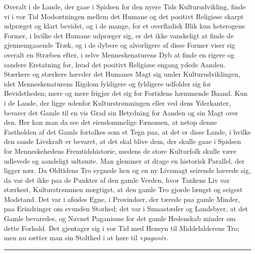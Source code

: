 \documentclass[12pt,a4paper,openany]{book}
\newcommand{\opage}[1]{\marginnote{\footnotesize\textit{[#1]}}}
\begin{document}
Overalt i de Lande, der gaae i Spidsen for den nyere Tids
Kulturudvikling, finde vi i vor Tid Modsætningen mellem
det Humane og det positivt Religiøse skarpt udpræget og
klart bevidst, og i de mange, for et overfladisk Blik kun
heterogene Former, i hvilke det Humane udpræger sig, er
det ikke vanskeligt at finde de gjennemgaaende Træk, og i de
dybere og alvorligere af disse Former viser sig overalt en
Stræben efter, i selve Menneskenaturens Dyb at finde en
rigere og sandere Erstatning for, hvad det positivt Religiøse
engang ydede Aanden. Stærkere og stærkere hævder det
Humanes Magt sig under Kulturudviklingen, idet Menneskenaturens
Rigdom fyldigere og fyldigere udfolder sig for
Bevidstheden; mere og mere frigjør det sig for Fortidens
hæmmende Baand. Kun i de Lande, der ligge udenfor
Kulturstrømningen eller ved dens Yderkanter, bevarer det
Gamle til en vis Grad sin Betydning for Aanden og sin
Magt over den. Her kan man da see det eiendommelige
Fænomen, at netop denne Fastholden af det Gamle fortolkes
som et Tegn paa, at det er disse Lande, i hvilke den
sande Livskraft er bevaret, at det skal blive dem, der skulle
gaae i Spidsen for Menneskehedens Fremtidshistorie, medens
de store Kulturfolk skulle være udlevede og aandeligt udtømte.
\opage{294}Man glemmer at drage en historisk Parallel, der ligger nær.
Da Oldtidens Tro sygnede hen og en ny Livsmagt seirende
hævede sig, da var det ikke paa de Punkter af den gamle
Verden, hvor Tankens Liv var stærkest, Kulturstrømmen
mægtigst, at den gamle Tro gjorde længst og seigest Modstand.
Det var i afsides Egne, i Provindser, der tærede
paa gamle Minder, paa Erindringer om svunden Storhed;
det var i Smaastæder og Landsbyer, at det Gamle bevaredes,
og Navnet Paganisme for det gamle Hedenskab
minder om dette Forhold. Det gjentager sig i vor Tid
med Hensyn til Middelalderens Tro; men nu sætter man
sin Stolthed i at høre til »\textit{pagani}«.

\begin{center}\rule{1.8cm}{0.4pt}\end{center}
\end{document}
